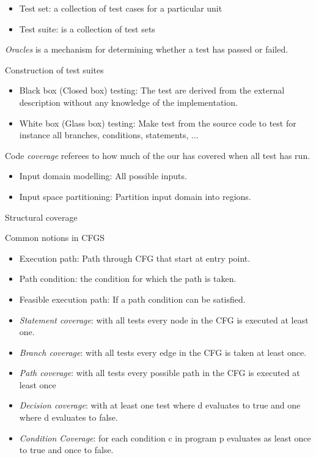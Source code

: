 \begin{itemize}
    \item Test set: a collection of test cases for a particular unit
    \item Test suite: is a collection of test sets
\end{itemize}

\textit{Oracles} is a mechanism for determining whether a test has passed or failed.

Construction of test suites
\begin{itemize}
    \item Black box (Closed box) testing: The test are derived from the external description without any knowledge of the implementation.
    \item White box (Glass box) testing: Make test from the source code to test for instance all branches, conditions, statements, ...
\end{itemize}

Code \textit{coverage} referees to how much of the our has covered when all test has run.

\begin{itemize}
    \item Input domain modelling: All possible inputs.
    \item Input space partitioning: Partition input domain into regions.
\end{itemize}

Structural coverage 

Common notions in CFGS
\begin{itemize}
    \item Execution path: Path through CFG that start at entry point.
    \item Path condition: the condition for which the path is taken.
    \item Feasible execution path: If a path condition can be satisfied.
\end{itemize}

\begin{itemize}
    \item \textit{Statement coverage}: with all tests every node in the CFG is executed at least one.
    \item \textit{Branch coverage}: with all tests every edge in the CFG is taken at least once.
    \item \textit{Path coverage}: with all tests every possible path in the CFG is executed at least once 
    \item \textit{Decision coverage}: with at least one test where d evaluates to true and one where d evaluates to false.
    \item \textit{Condition Coverage}: for each condition c in program p evaluates as least once to true and once to false.
\end{itemize}

